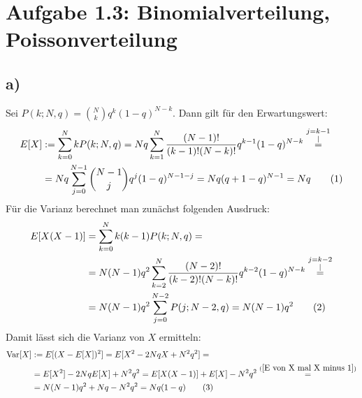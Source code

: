 \documentclass[a4paper,12pt]{article}
\newcommand\numberthis{\addtocounter{equation}{1}\tag{\theequation}}
\newcommand{\kom}{}
\newcommand{\tecxt}{}
\begin{document}
\section*{Aufgabe 1.3: Binomialverteilung, Poissonverteilung}
\subsection*{a)}Sei $P(k;N,q)=\binom{N}{k}q^k(1-q)^{N-k}$. Dann gilt für den Erwartungswert:
\begin{align*}
E[X]&:=\sum_{k=0}^NkP(k;N,q)=Nq\sum_{k=1}^N\frac{(N-1)!}{(k-1)!(N-k)!}q^{k-1}(1-q)^{N-k}\kom\overset{\substack{{j=k-1} \\ |}}{=}\\
&=Nq\sum_{j=0}^{N-1}\binom{N-1}{j}q^j(1-q)^{N-1-j}=Nq(q+1-q)^{N-1}=Nq\numberthis\label{Erwartungswert Binomialverteilung}
\end{align*} 
Für die Varianz berechnet man zunächst folgenden Ausdruck:
\begin{align*}
E[X(X-1)]&=\sum_{k=0}^Nk(k-1)P(k;N,q)=\\
&=N(N-1)q^2\sum_{k=2}^N\frac{(N-2)!}{(k-2)!(N-k)!}q^{k-2}(1-q)^{N-k}\kom\overset{\substack{{j=k-2} \\ |}}{=}\\
&=N(N-1)q^2\sum_{j=0}^{N-2}P(j;N-2,q)=N(N-1)q^2\numberthis\label{E von X mal X minus 1}
\end{align*}
Damit lässt sich die Varianz von $X$ ermitteln:
\begin{align*}
\tecxt\text{Var}[X]&:=E[(X-E[X])^2]=E[X^2-2NqX+N^2q^2]=\\
&=E[X^2]-2NqE[X]+N^2q^2=E[X(X-1)]+E[X]-N^2q^2\overset{(\ref{E von X mal X minus 1})}{=}\\
&=N(N-1)q^2+Nq-N^2q^2=Nq(1-q)\numberthis\label{Varianz Binomialverteilung}
\end{align*}
\end{document}
